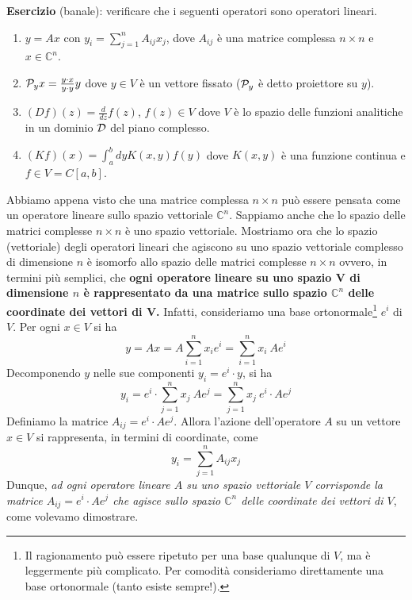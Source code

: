 \documentclass[a4paper,10pt]{article}
\newcommand{\linea}{\vskip14pt \noindent}
\begin{document}
\linea
{\bf Esercizio} (banale): verificare che i seguenti operatori sono operatori lineari.
\begin{enumerate}
\item $y=Ax$ con $y_i=\sum_{j=1}^n A_{ij} x_j$, dove $A_{ij}$ \`e una matrice complessa $n\times n$ e $x \in \mathbb{C}^n$.
\item ${\cal P}_y x = \frac{y \cdot x}{y \cdot y} y$ dove $y \in V$ \`e un vettore fissato 
(${\cal P}_y$ \`e detto proiettore su $y$).
\item $(Df)(z) = \frac{d}{dz} f(z)$, $f(z) \in V$ dove $V$ \`e lo spazio delle funzioni analitiche in un dominio
${\cal D}$ del piano complesso. 
\item $(Kf)(x) = \int_a^b dy K(x,y) f(y)$ dove $K(x,y)$ \`e una funzione continua e $f \in V = C[a,b]$.
\end{enumerate}

\linea
Abbiamo appena visto che una matrice complessa $n\times n$ pu\`o essere pensata come un operatore
lineare sullo spazio vettoriale $\mathbb{C}^n$. Sappiamo anche che lo spazio delle matrici 
complesse $n\times n$ \`e uno spazio vettoriale.
Mostriamo ora che lo spazio (vettoriale) degli operatori lineari che agiscono
su uno spazio vettoriale complesso di dimensione $n$ \`e isomorfo allo spazio delle matrici complesse
$n\times n$ ovvero, in termini pi\`u semplici, che
\vskip5pt
\noindent
{\bf ogni operatore lineare su uno spazio V di dimensione $n$ \`e rappresentato da una matrice
sullo spazio $\mathbb{C}^n$ delle coordinate dei vettori di V.}
\vskip5pt
\noindent
Infatti, consideriamo una base ortonormale\footnote{Il ragionamento pu\`o essere ripetuto
per una base qualunque di $V$, ma \`e leggermente pi\`u complicato.
Per comodit\`a consideriamo direttamente una base ortonormale
(tanto esiste sempre!).}
$e^i$ di $V$. Per ogni $x\in V$ si ha
\begin{equation} \nonumber
y = Ax = A \sum_{i=1}^n x_i e^i = \sum_{i=1}^n x_i \ Ae^i
\end{equation}
Decomponendo $y$ nelle sue componenti $y_i = e^i \cdot y$, si ha
\begin{equation}
y_i = e^i \cdot  \sum_{j=1}^n x_j \ Ae^j =  \sum_{j=1}^n x_j \ e^i \cdot Ae^j
\end{equation}
Definiamo la matrice $A_{ij} = e^i \cdot Ae^j$. Allora l'azione dell'operatore $A$ su un vettore $x\in V$ si
rappresenta, in termini di coordinate, come
\begin{equation}
y_i = \sum_{j=1}^n A_{ij} x_j
\end{equation}
Dunque, {\it ad ogni operatore lineare $A$ su uno spazio vettoriale $V$ corrisponde la matrice
$A_{ij}= e^i \cdot Ae^j$ che agisce sullo spazio $\mathbb{C}^n$ delle coordinate dei vettori di $V$},
come volevamo dimostrare.
\end{document}
